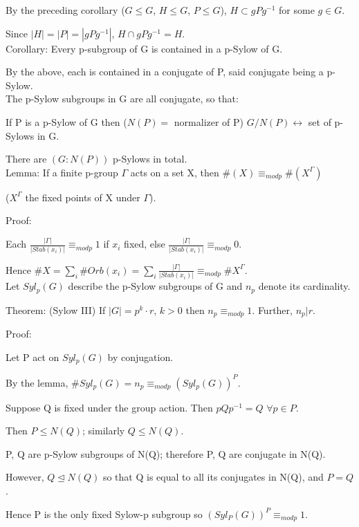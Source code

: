 \documentclass[12pt]{article}
\newcommand{\inv}{^{-1}}
\begin{document}
By the preceding corollary ($G \leq G$, $H \leq G$, $P \leq G$), $H \subset gPg\inv$ for some $g \in G$.

Since $|H| = |P| = |gPg^{-1}|$, $H \cap gPg\inv = H$.\\

\noindent
Corollary: Every p-subgroup of G is contained in a p-Sylow of G.

By the above, each is contained in a conjugate of P, said conjugate being a p-Sylow.\\

\noindent
The p-Sylow subgroups in G are all conjugate, so that:

If P is a p-Sylow of G then ($N(P) =$ normalizer of P) $G/N(P) \leftrightarrow$ set of p-Sylows in G.

There are $(G: N(P))$ p-Sylows in total.\\

\noindent
Lemma: If a finite p-group $\Gamma$ acts on a set X, then $\#(X) \equiv_{mod p} \#(X^{\Gamma})$

($X^{\Gamma}$ the fixed points of X under $\Gamma$).

\noindent
Proof:

Each $\frac{|\Gamma|}{|Stab(x_i)|} \equiv_{mod p} 1$ if $x_i$ fixed, else $\frac{|\Gamma|}{|Stab(x_i)|} \equiv_{mod p} 0$.

Hence $\#X = \sum_i \#Orb(x_i) = \sum_i \frac{|\Gamma|}{|Stab(x_i)|} \equiv_{mod p} \#X^{\Gamma}$.\\

\noindent
Let $Syl_p(G)$ describe the p-Sylow subgroups of G and $n_p$ denote its cardinality.

\noindent
Theorem: (Sylow III) If $|G|= p^k \cdot r$, $k > 0$ then $n_p \equiv_{mod p} 1$.  Further, $n_p | r$.

\noindent
Proof:

Let P act on $Syl_p(G)$ by conjugation.

By the lemma, $\#Syl_p(G) = n_p \equiv_{mod p} (Syl_p(G))^P$.

Suppose Q is fixed under the group action.  Then $pQp\inv = Q$ $\forall p \in P$.

Then $P \leq N(Q)$; similarly $Q \leq N(Q)$.

P, Q are p-Sylow subgroups of N(Q); therefore P, Q are conjugate in N(Q).

However, $Q \trianglelefteq N(Q)$ so that Q is equal to all its conjugates in N(Q), and $P = Q$.

Hence P is the only fixed Sylow-p subgroup so $(Syl_P(G))^P \equiv_{mod p} 1$.
\end{document}
